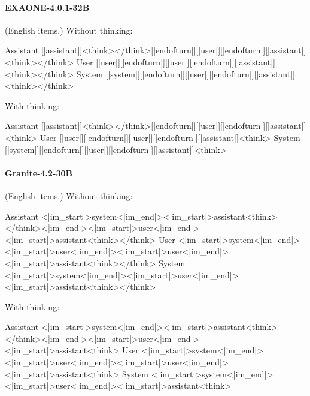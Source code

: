 \paragraph{EXAONE-4.0.1-32B} (English items.)
\noindent Without thinking:
\begin{Rendering}
Assistant  [|assistant|]\NL{}<think>\NL{}\NL{}</think>\NL{}\NL{}[|endofturn|]\NL{}[|user|]\NL{}[|endofturn|]\NL{}[|assistant|]\NL{}<think>\NL{}\NL{}</think>\NL{}\NL{}
User       [|user|]\NL{}[|endofturn|]\NL{}[|user|]\NL{}[|endofturn|]\NL{}[|assistant|]\NL{}<think>\NL{}\NL{}</think>\NL{}\NL{}
System     [|system|]\NL{}[|endofturn|]\NL{}[|user|]\NL{}[|endofturn|]\NL{}[|assistant|]\NL{}<think>\NL{}\NL{}</think>\NL{}\NL{}
\end{Rendering}
\noindent With thinking:
\begin{Rendering}
Assistant  [|assistant|]\NL{}<think>\NL{}\NL{}</think>\NL{}\NL{}[|endofturn|]\NL{}[|user|]\NL{}[|endofturn|]\NL{}[|assistant|]\NL{}<think>\NL{}
User       [|user|]\NL{}[|endofturn|]\NL{}[|user|]\NL{}[|endofturn|]\NL{}[|assistant|]\NL{}<think>\NL{}
System     [|system|]\NL{}[|endofturn|]\NL{}[|user|]\NL{}[|endofturn|]\NL{}[|assistant|]\NL{}<think>\NL{}
\end{Rendering}
\paragraph{Granite-4.2-30B} (English items.)
\noindent Without thinking:
\begin{Rendering}
Assistant  <|im_start|>system\NL{}<|im_end|>\NL{}<|im_start|>assistant\NL{}<think></think><|im_end|>\NL{}<|im_start|>user\NL{}<|im_end|>\NL{}<|im_start|>assistant\NL{}<think></think>
User       <|im_start|>system\NL{}<|im_end|>\NL{}<|im_start|>user\NL{}<|im_end|>\NL{}<|im_start|>user\NL{}<|im_end|>\NL{}<|im_start|>assistant\NL{}<think></think>
System     <|im_start|>system\NL{}<|im_end|>\NL{}<|im_start|>user\NL{}<|im_end|>\NL{}<|im_start|>assistant\NL{}<think></think>
\end{Rendering}
\noindent With thinking:
\begin{Rendering}
Assistant  <|im_start|>system\NL{}<|im_end|>\NL{}<|im_start|>assistant\NL{}<think></think><|im_end|>\NL{}<|im_start|>user\NL{}<|im_end|>\NL{}<|im_start|>assistant\NL{}<think>\NL{}
User       <|im_start|>system\NL{}<|im_end|>\NL{}<|im_start|>user\NL{}<|im_end|>\NL{}<|im_start|>user\NL{}<|im_end|>\NL{}<|im_start|>assistant\NL{}<think>\NL{}
System     <|im_start|>system\NL{}<|im_end|>\NL{}<|im_start|>user\NL{}<|im_end|>\NL{}<|im_start|>assistant\NL{}<think>\NL{}
\end{Rendering}
